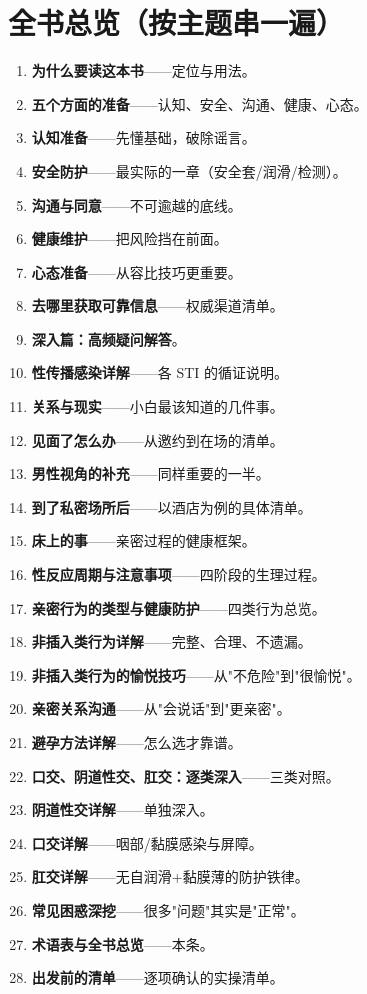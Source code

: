 \documentclass[12pt,UTF8,openany]{ctexbook}
\begin{document}
\section{全书总览（按主题串一遍）}

\begin{enumerate}[leftmargin=2em,itemsep=0.3em]
  \item \textbf{为什么要读这本书}——定位与用法。
  \item \textbf{五个方面的准备}——认知、安全、沟通、健康、心态。
  \item \textbf{认知准备}——先懂基础，破除谣言。
  \item \textbf{安全防护}——最实际的一章（安全套/润滑/检测）。
  \item \textbf{沟通与同意}——不可逾越的底线。
  \item \textbf{健康维护}——把风险挡在前面。
  \item \textbf{心态准备}——从容比技巧更重要。
  \item \textbf{去哪里获取可靠信息}——权威渠道清单。
  \item \textbf{深入篇：高频疑问解答}。
  \item \textbf{性传播感染详解}——各 STI 的循证说明。
  \item \textbf{关系与现实}——小白最该知道的几件事。
  \item \textbf{见面了怎么办}——从邀约到在场的清单。
  \item \textbf{男性视角的补充}——同样重要的一半。
  \item \textbf{到了私密场所后}——以酒店为例的具体清单。
  \item \textbf{床上的事}——亲密过程的健康框架。
  \item \textbf{性反应周期与注意事项}——四阶段的生理过程。
  \item \textbf{亲密行为的类型与健康防护}——四类行为总览。
  \item \textbf{非插入类行为详解}——完整、合理、不遗漏。
  \item \textbf{非插入类行为的愉悦技巧}——从"不危险"到"很愉悦"。
  \item \textbf{亲密关系沟通}——从"会说话"到"更亲密"。
  \item \textbf{避孕方法详解}——怎么选才靠谱。
  \item \textbf{口交、阴道性交、肛交：逐类深入}——三类对照。
  \item \textbf{阴道性交详解}——单独深入。
  \item \textbf{口交详解}——咽部/黏膜感染与屏障。
  \item \textbf{肛交详解}——无自润滑+黏膜薄的防护铁律。
  \item \textbf{常见困惑深挖}——很多"问题"其实是"正常"。
  \item \textbf{术语表与全书总览}——本条。
  \item \textbf{出发前的清单}——逐项确认的实操清单。
\end{enumerate}
\end{document}

